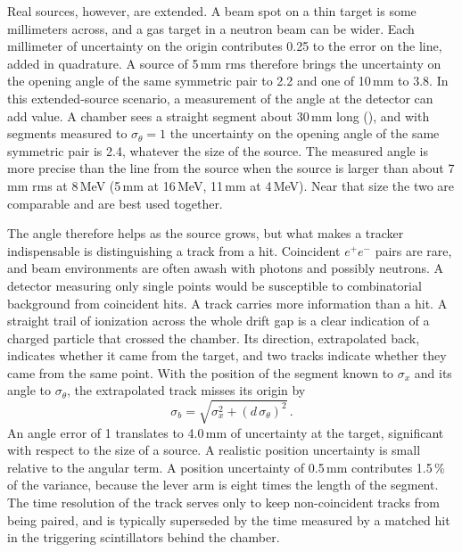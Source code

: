 Real sources, however, are extended. A beam spot on a thin target is some millimeters across, and a gas target in a neutron beam can be wider. Each millimeter of uncertainty on the origin contributes 0.25\textdegree{} to the error on the line, added in quadrature. A source of 5\,mm
rms therefore brings the uncertainty on the opening angle of the same symmetric pair to 2.2\textdegree{} and one of 10\,mm to 3.8\textdegree. In this extended-source scenario, a measurement of the angle at the detector can add value. A chamber sees a straight segment about
30\,mm long (), and with segments measured to $\sigma_{\theta}=1$\textdegree{} the uncertainty on the opening angle of the same symmetric pair is 2.4\textdegree{}, whatever the size of the source. The measured angle is more precise than the line from the source when the source is larger than about 7\,mm rms at 8\,MeV (5\,mm at 16\,MeV, 11\,mm at 4\,MeV). Near that size the two are comparable and are best used together.

The angle therefore helps as the source grows, but what makes
a tracker indispensable is distinguishing a track from a hit. Coincident $e^+e^-$ pairs are rare, and beam environments are often awash with photons and possibly neutrons. A detector measuring only single points would be susceptible to combinatorial background from coincident hits. A track carries more information than a hit. A straight trail of ionization across the whole drift gap is a clear indication of a charged particle that crossed the chamber. Its direction, extrapolated back, indicates whether it
came from the target, and two tracks indicate whether they came from the same point. With the position of the segment known to $\sigma_x$ and its angle to $\sigma_\theta$, the extrapolated track misses its origin by
\begin{equation}
  \sigma_b=\sqrt{\sigma_x^2+(d\,\sigma_\theta)^2}\,.\label{eq:pointing}
\end{equation}
An angle error of 1\textdegree{} translates to 4.0\,mm of uncertainty at the target, significant with respect to the size of a source. A realistic position uncertainty is small relative to the angular term. A position uncertainty of 0.5\,mm contributes 1.5\,\% of the variance, because the lever arm is eight times the length of the segment. The time resolution of the track serves only to keep non-coincident tracks from being paired, and is typically superseded by the time measured by a matched hit in the triggering scintillators behind the chamber.


